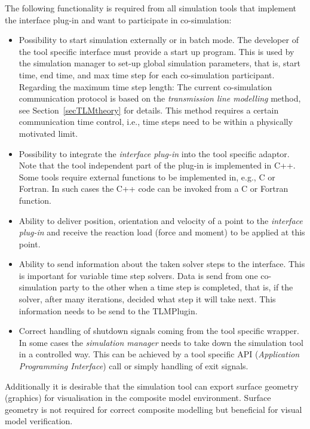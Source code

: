 The following functionality is required from all simulation tools that implement the interface plug-in and want to participate in
co-simulation:
\begin{itemize}
\item 
Possibility to start simulation externally or in batch mode.
The developer of the tool specific interface must provide a start up program. 
This is used by the simulation manager to set-up global simulation parameters, that is, start time, end time, and max time step for each co-simulation participant. 
Regarding the maximum time step length: The current co-simulation communication protocol is based on the {\em transmission line modelling} method, see Section~\ref{secTLMtheory} for details. 
This method requires a certain communication time control, i.e., time steps need to be within a physically motivated limit.

\item 
Possibility to integrate the {\em interface plug-in} into the tool specific adaptor. 
Note that the tool independent part of the plug-in is implemented in C++. 
Some tools require external functions to be implemented in, e.g., C or Fortran. 
In such cases the C++ code can be invoked from a C or Fortran function.

\item 
Ability to deliver position, orientation and velocity of a point to the {\em interface plug-in} and receive the reaction load (force and moment) to be applied at this point.

\item 
Ability to send information about the taken solver steps to the interface. 
This is important for variable time step solvers. 
Data is send from one co-simulation party to the other when a time step is completed, that is, if the solver, after many iterations, decided what step it will take next. 
This information needs to be send to the TLMPlugin.

\item 
Correct handling of shutdown signals coming from the tool specific wrapper. 
In some cases the {\em simulation manager} needs to	take down the simulation tool in a controlled way. 
This can be	achieved by a tool specific API ({\em Application Programming Interface}) call or simply handling of exit signals.

\end{itemize}

\noindent Additionally it is desirable that the simulation tool can export surface geometry (graphics) for visualisation in the composite model environment. 
Surface geometry is not required for correct composite modelling but beneficial for visual model verification.

